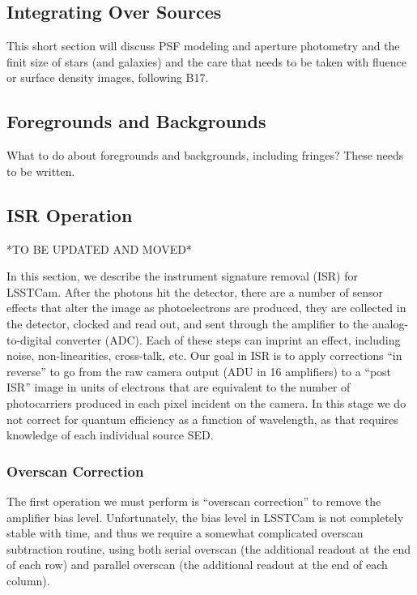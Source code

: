 \documentclass[SE,authoryear,lsstdraft,toc]{lsstdoc}
\begin{document}
\subsection{Integrating Over Sources}

This short section will discuss PSF modeling and aperture photometry and the
finit size of stars (and galaxies) and the care that needs to be taken with
fluence or surface density images, following B17.


\subsection{Foregrounds and Backgrounds}

What to do about foregrounds and backgrounds, including fringes?  These needs
to be written.

\subsection{ISR Operation}

*TO BE UPDATED AND MOVED*

In this section, we describe the instrument signature removal (ISR) for
LSSTCam.  After the photons hit the detector, there are a number of sensor
effects that alter the image as photoelectrons are produced, they are collected
in the detector, clocked and read out, and sent through the amplifier to the
analog-to-digital converter (ADC).  Each of these steps can imprint an effect,
including noise, non-linearities, cross-talk, etc.  Our goal in ISR is to apply
corrections ``in reverse'' to go from the raw camera output (ADU in 16
amplifiers) to a ``post ISR'' image in units of electrons that are equivalent
to the number of photocarriers produced in each pixel incident on the camera.
In this stage we do not correct for quantum efficiency as a function of
wavelength, as that requires knowledge of each individual source SED.


\subsubsection{Overscan Correction}

The first operation we must perform is ``overscan correction'' to remove the
amplifier bias level.  Unfortunately, the bias level in LSSTCam is not
completely stable with time, and thus we require a somewhat complicated
overscan subtraction routine, using both serial overscan (the additional
readout at the end of each row) and parallel overscan (the additional readout
at the end of each column).
\end{document}
